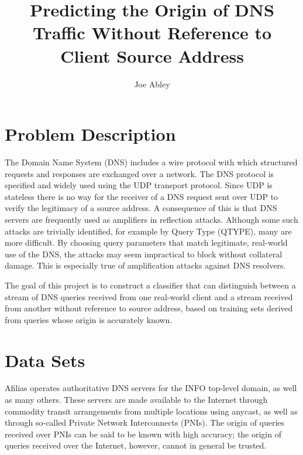 \documentclass[9pt,letterpaper,twocolumn]{scrartcl}
\begin{document}
\titlehead{{\Large Western University \hfill ECE 9603\\}
  Electrical and Computer Engineering \hfill Fall 2018}
\subject{Project Proposal}
\title{Predicting the Origin of DNS Traffic Without Reference to Client Source Address}
\author{Joe Abley}

\maketitle


\section{Problem Description}
The Domain Name System (DNS) includes a wire protocol with which
structured requests and responses are exchanged over a network. The
DNS protocol is specified and widely used using the UDP transport
protocol.  Since UDP is stateless there is no way for the receiver
of a DNS request sent over UDP to verify the legitimacy of a source
address.  A consequence of this is that DNS servers are frequently
used as amplifiers in reflection attacks\cite{RFC5358}. Although
some such attacks are trivially identified, for example by Query
Type (QTYPE), many are more difficult.  By choosing query parameters
that match legitimate, real-world use of the DNS, the attacks may
seem impractical to block without collateral damage. This is
especially true of amplification attacks against DNS resolvers.

The goal of this project is to construct a classifier that can
distinguish between a stream of DNS queries received from one
real-world client and a stream received from another without reference
to source address, based on training sets derived from queries whose
origin is accurately known.

\section{Data Sets}
Afilias operates authoritative DNS servers for the INFO top-level
domain, as well as many others. These servers are made available
to the Internet through commodity transit arrangements from multiple
locations using anycast\cite{RFC4786}, as well as through so-called
Private Network Interconnects (PNIs). The origin of queries received
over PNIs can be said to be known with high accuracy; the origin
of queries received over the Internet, however, cannot in general
be trusted.
\end{document}
